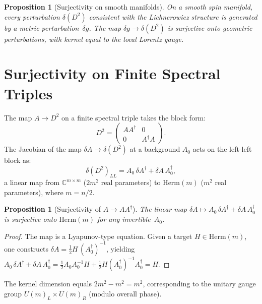 \documentclass[12pt,a4paper]{article}
\newcommand{\half}{\tfrac{1}{2}}
\newtheorem{proposition}[theorem]{Proposition}
\theoremstyle{definition}
\theoremstyle{remark}
\begin{document}
\begin{proposition}[Surjectivity on smooth manifolds]
\label{prop:surj-smooth}
On a smooth spin manifold, every perturbation $\delta(D^2)$ consistent with
the Lichnerowicz structure is generated by a metric perturbation~$\delta g$.
The map $\delta g \to \delta(D^2)$ is surjective onto geometric perturbations,
with kernel equal to the local Lorentz gauge.
\end{proposition}

\section{Surjectivity on Finite Spectral Triples}
\label{sec:surjectivity}

The map $A \to D^2$ on a finite spectral triple takes the block form:
\begin{equation}\label{eq:D2-block}
  D^2 = \begin{pmatrix} AA^\dag & 0 \\ 0 & A^\dag A \end{pmatrix}.
\end{equation}
The Jacobian of the map $\delta A \to \delta(D^2)$ at a background $A_0$
acts on the left-left block as:
\begin{equation}\label{eq:linearization}
  \delta(D^2)_{LL} = A_0\,\delta A^\dag + \delta A\, A_0^\dag,
\end{equation}
a linear map from $\mathbb{C}^{m\times m}$ ($2m^2$ real parameters) to
$\mathrm{Herm}(m)$ ($m^2$ real parameters), where $m = n/2$.

\begin{proposition}[Surjectivity of $A \to AA^\dag$]
\label{prop:surj-finite}
The linear map $\delta A \mapsto A_0\,\delta A^\dag + \delta A\, A_0^\dag$
is surjective onto $\mathrm{Herm}(m)$ for any invertible~$A_0$.
\end{proposition}

\begin{proof}
The map is a Lyapunov-type equation.  Given a target $H \in \mathrm{Herm}(m)$,
one constructs $\delta A = \half H\, (A_0^\dag)^{-1}$, yielding
$A_0\,\delta A^\dag + \delta A\, A_0^\dag
= \half A_0 A_0^{-1} H + \half H (A_0^\dag)^{-1} A_0^\dag = H$.
\end{proof}

The kernel dimension equals $2m^2 - m^2 = m^2$, corresponding to the
unitary gauge group $U(m)_L \times U(m)_R$ (modulo overall phase).
\end{document}
